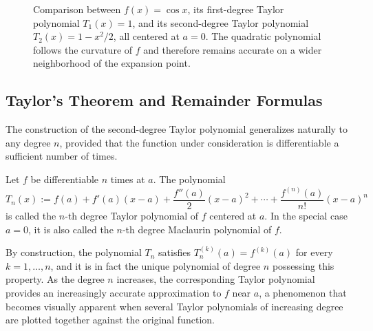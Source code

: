 \begin{figure}[!htbp]
\centering
{}
\caption[Linear and quadratic Taylor approximation]{Comparison between $f(x)=\cos x$, its
  first-degree Taylor polynomial $T_1(x)=1$, and its second-degree Taylor polynomial
  $T_2(x)=1-x^2/2$, all centered at $a=0$. The quadratic polynomial follows the curvature of $f$ and therefore
  remains accurate on a wider neighborhood of the expansion point.}
\label{fig:ch5-taylor}
\end{figure}

\subsection{Taylor's Theorem and Remainder Formulas}

The construction of the second-degree Taylor polynomial generalizes naturally to any degree $n$, provided that the function under consideration is differentiable a sufficient number of times.

\begin{definition}
Let $f$ be differentiable $n$ times at $a$. The polynomial
\[
T_n(x) := f(a) + f'(a)(x-a) + \frac{f''(a)}{2}(x-a)^2 + \cdots + \frac{f^{(n)}(a)}{n!}(x-a)^n
\]
 is called the $n$-th degree Taylor polynomial of $f$ centered at $a$. In the special case $a = 0$, it is also called the $n$-th degree Maclaurin polynomial of $f$.
\end{definition}

By construction, the polynomial $T_n$ satisfies $T_n^{(k)}(a) = f^{(k)}(a)$ for every $k = 1, \dots, n$, and it is in fact the unique polynomial of degree $n$ possessing this property. As the degree $n$ increases, the corresponding Taylor polynomial provides an increasingly accurate approximation to $f$ near $a$, a phenomenon that becomes visually apparent when several Taylor polynomials of increasing degree are plotted together against the original function.

